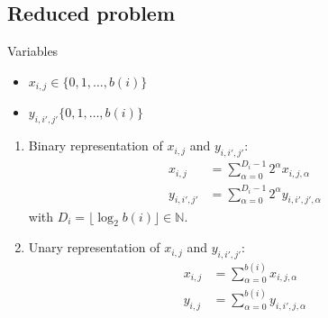 \documentclass{article}
\begin{document}
\subsection{Reduced problem}
Variables
\begin{itemize}
    \item $x_{i, j} \in \{0, 1, \dots, b(i)\}$
    \item $y_{i, i', j'} \{0, 1, \dots, b(i)\}$
\end{itemize}
\begin{enumerate}
    \item 
    Binary representation of $x_{i, j}$ and $y_{i, i', j'}$:
    \begin{align*}
        x_{i, j} & = \sum_{\alpha = 0}^{D_i - 1} 2^\alpha x_{i, j, \alpha} \\
        y_{i, i', j'} & = \sum_{\alpha = 0}^{D_i - 1} 2^\alpha y_{i, i', j', \alpha}
    \end{align*}
    with $D_i = \lfloor \log_2 b(i) \rfloor \in \mathbb{N}$.
    \item 
    Unary representation of $x_{i, j}$ and $y_{i, i', j'}$:
    \begin{align*}
        x_{i, j} & = \sum_{\alpha = 0}^{b(i)} x_{i, j, \alpha} \\
        y_{i, j} & = \sum_{\alpha = 0}^{b(i)} y_{i, i', j, \alpha} \\
    \end{align*}
\end{enumerate}
\end{document}
